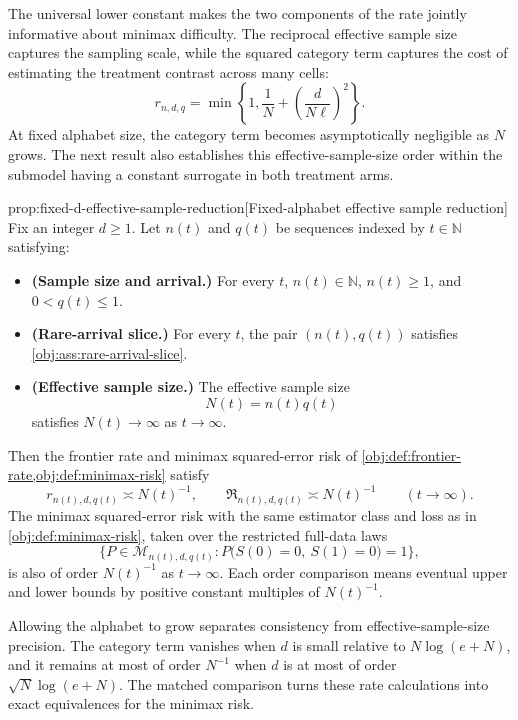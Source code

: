 The universal lower constant  makes the two components of the rate jointly informative about minimax difficulty. The reciprocal effective sample size captures the sampling scale, while the squared category term captures the cost of estimating the treatment contrast across many cells:
\[
r_{n,d,q}
=
\min\left\{1,\frac1N+\left(\frac{d}{N\ell}\right)^2\right\}.
\]
At fixed alphabet size, the category term becomes asymptotically negligible as \(N\) grows. The next result also establishes this effective-sample-size order within the submodel having a constant surrogate in both treatment arms.

\begin{propositionv}{prop:fixed-d-effective-sample-reduction}[Fixed-alphabet effective sample reduction]
Fix an integer \(d\ge 1\). Let \(n(t)\) and \(q(t)\) be sequences indexed by \(t\in\mathbb N\) satisfying:
\begin{itemize}
\item \textbf{(Sample size and arrival.)} For every \(t\), \(n(t)\in\mathbb N\), \(n(t)\ge 1\), and \(0<q(t)\le 1\).
\item \textbf{(Rare-arrival slice.)} For every \(t\), the pair \((n(t),q(t))\) satisfies \cref{obj:ass:rare-arrival-slice}.
\item \textbf{(Effective sample size.)} The effective sample size
\[
N(t)=n(t)q(t)
\]
satisfies \(N(t)\to\infty\) as \(t\to\infty\).
\end{itemize}
Then the frontier rate and minimax squared-error risk of \cref{obj:def:frontier-rate,obj:def:minimax-risk} satisfy
\[
r_{n(t),d,q(t)}\asymp N(t)^{-1},
\qquad
\mathfrak R_{n(t),d,q(t)}\asymp N(t)^{-1}
\qquad (t\to\infty).
\]
The minimax squared-error risk with the same estimator class and loss as in \cref{obj:def:minimax-risk}, taken over the restricted full-data laws
\[
\bigl\{P\in\mathcal M_{n(t),d,q(t)}:
P\bigl(S(0)=0,\ S(1)=0\bigr)=1\bigr\},
\]
is also of order \(N(t)^{-1}\) as \(t\to\infty\). Each order comparison means eventual upper and lower bounds by positive constant multiples of \(N(t)^{-1}\).
\end{propositionv}

Allowing the alphabet to grow separates consistency from effective-sample-size precision. The category term vanishes when \(d\) is small relative to \(N\log(e+N)\), and it remains at most of order \(N^{-1}\) when \(d\) is at most of order \(\sqrt N\log(e+N)\). The matched comparison turns these rate calculations into exact equivalences for the minimax risk.

